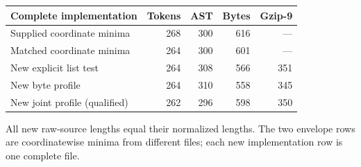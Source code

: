 \begin{center}
\small
\begin{tabular}{lrrrr}
\toprule
Complete implementation & Tokens & AST & Bytes & Gzip-9\\
\midrule
Supplied coordinate minima & 268 & 300 & 616 & ---\\
Matched coordinate minima & 264 & 300 & 601 & ---\\
\midrule
New explicit list test & 264 & 308 & 566 & 351\\
New byte profile & 264 & 310 & 558 & 345\\
New joint profile (qualified) & 262 & 296 & 598 & 350\\
\bottomrule
\end{tabular}
\end{center}
All new raw-source lengths equal their normalized lengths. 
The two envelope rows are coordinatewise minima from different files; 
each new implementation row is one complete file.
